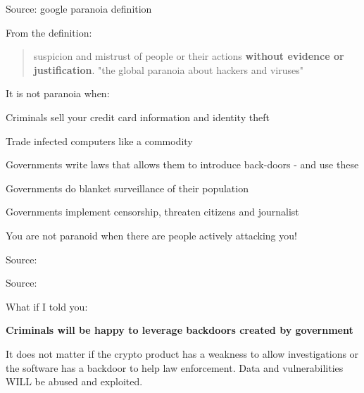 \documentclass[20pt,landscape,a4paper,footrule]{foils}
\begin{document}
Source: google paranoia definition


From the definition:
\begin{quote}
suspicion and mistrust of people or their actions  {\bf without evidence or justification}.
"the global paranoia about hackers and viruses"
\end{quote}

\begin{list1}
\item It is not paranoia when:
\begin{list2}
\item Criminals sell your credit card information and identity theft
\item Trade infected computers like a commodity
\item Governments write laws that allows them to introduce back-doors - and use these
\item Governments do blanket surveillance of their population
\item Governments implement censorship, threaten citizens and journalist
\end{list2}
\end{list1}

\vskip 1cm
\centerline{You are not paranoid when there are people actively attacking you!}




{\small Source:
}




{\small Source:
}





What if I told you:

{\Large \bf Criminals will be happy to leverage backdoors created by government}

It does not matter if the crypto product has a weakness to allow investigations or the software has a backdoor to help law enforcement. Data and vulnerabilities WILL be abused and exploited.
\end{document}
